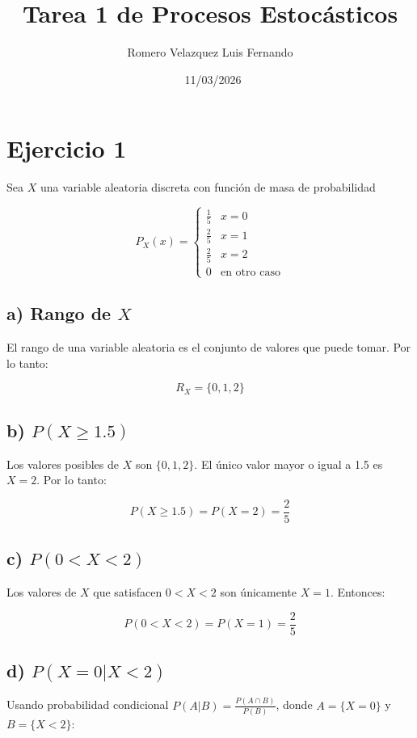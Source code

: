 \documentclass{article}
\title{Tarea 1 de Procesos Estocásticos}
\author{Romero Velazquez Luis Fernando}
\date{\ 11/03/2026}
\begin{document}
\maketitle

\section*{Ejercicio 1}

Sea \(X\) una variable aleatoria discreta con función de masa de probabilidad

\[
P_X(x) = \begin{cases} 
\frac{1}{5} & x = 0 \\ 
\frac{2}{5} & x = 1 \\ 
\frac{2}{5} & x = 2 \\ 
0 & \text{en otro caso} 
\end{cases}
\]

\subsection*{a) Rango de \(X\)}

El rango de una variable aleatoria es el conjunto de valores que puede tomar. Por lo tanto:

\[
R_X = \{0, 1, 2\}
\]

\subsection*{b) \(P(X \geq 1.5)\)}

Los valores posibles de \(X\) son \(\{0, 1, 2\}\). El único valor mayor o igual a 1.5 es \(X = 2\). Por lo tanto:

\[
P(X \geq 1.5) = P(X = 2) = \frac{2}{5}
\]

\subsection*{c) \(P(0 < X < 2)\)}

Los valores de \(X\) que satisfacen \(0 < X < 2\) son únicamente \(X = 1\). Entonces:

\[
P(0 < X < 2) = P(X = 1) = \frac{2}{5}
\]

\subsection*{d) \(P(X = 0 | X < 2)\)}

Usando probabilidad condicional \(P(A|B) = \frac{P(A \cap B)}{P(B)}\), donde \(A = \{X = 0\}\) y \(B = \{X < 2\}\):
\end{document}
